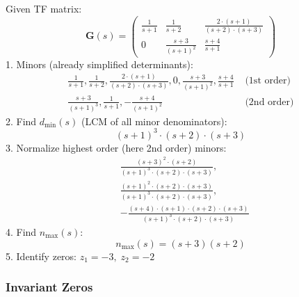 \begin{examplesection}
    Given TF matrix:
    \begin{equation*}
        \mathbf{G}(s)=\begin{pmatrix}
            \frac1{s+1} & \frac1{s+2}           & \frac{2\cdot(s+1)}{(s+2)\cdot(s+3)} \\
            0           & \frac{s+3}{{(s+1)}^2} & \frac{s+4}{s+1}
        \end{pmatrix}
    \end{equation*}
    1. Minors (already simplified determinants):
    \begin{align*}
        \frac{1}{s+1},\frac{1}{s+2},\frac{2\cdot(s+1)}{(s+2)\cdot(s+3)},0,\frac{s+3}{{(s+1)}^{2}},\frac{s+4}{s+1} & \text{ (1st order)} \\
        \frac{s+3}{{(s+1)}^3},\frac{1}{s+1},-\frac{s+4}{{(s+1)}^2}                                                & \text{ (2nd order)}
    \end{align*}
    2. Find $d_{\min}(s)$ (LCM of all minor denominators):
    \begin{equation*}
        {(s+1)}^3\cdot(s+2)\cdot(s+3)
    \end{equation*}
    3. Normalize highest order (here 2nd order) minors:
    \begin{align*}
         & \frac{{(s+3)}^2\cdot(s+2)}{{(s+1)}^3\cdot(s+2)\cdot(s+3)} ,                \\
         & \frac{{(s+1)}^2\cdot(s+2)\cdot(s+3)}{{(s+1)}^3\cdot(s+2)\cdot(s+3)} ,      \\
         & -\frac{(s+4)\cdot(s+1)\cdot(s+2)\cdot(s+3)}{{(s+1)}^3\cdot(s+2)\cdot(s+3)}
    \end{align*}
    4. Find $n_{\max}(s)$:
    \begin{equation*}
        n_{\max}(s)=(s+3)(s+2)
    \end{equation*}
    5. Identify zeros: $z_1=-3,\;z_2=-2$
\end{examplesection}

\subsubsection{Invariant Zeros}

